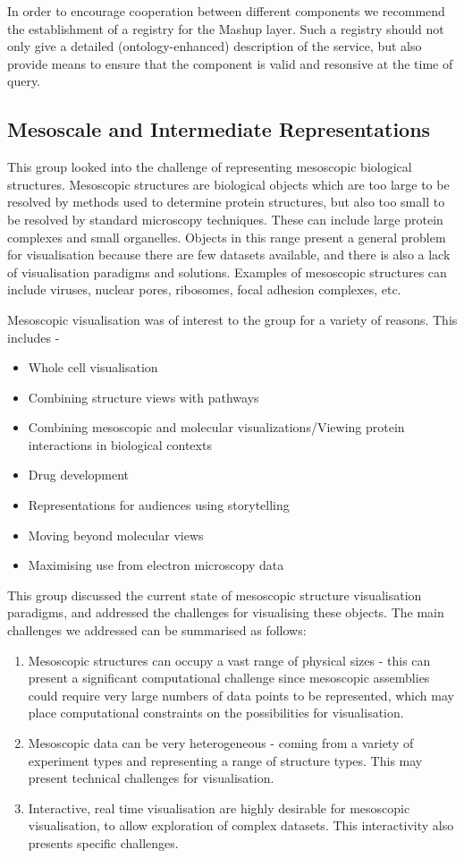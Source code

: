 \documentclass[a4paper]{article}
\begin{document}
In order to encourage cooperation between different components we recommend the establishment of a registry for the Mashup layer. Such a registry should not only give a detailed (ontology-enhanced) description of the service, but also provide means to ensure that the component is valid and resonsive at the time of query.


\subsection{Mesoscale and Intermediate Representations}

This group looked into the challenge of representing mesoscopic biological structures. Mesoscopic structures are biological objects which are too large to be resolved by methods used to determine protein structures, but also too small to be resolved by standard microscopy techniques. These can include large protein complexes and small organelles. Objects in this range present a general problem for visualisation because there are few datasets available, and there is also a lack of visualisation paradigms and solutions. Examples of mesoscopic structures can include viruses, nuclear pores, ribosomes, focal adhesion complexes, etc.

Mesoscopic visualisation was of interest to the group for a variety of reasons.
This includes -
\begin{itemize}
\item Whole cell visualisation
\item Combining structure views with pathways
\item Combining mesoscopic and molecular visualizations/Viewing protein interactions in biological contexts
\item Drug development
\item Representations for audiences using storytelling
\item Moving beyond molecular views
\item Maximising use from electron microscopy data
\end{itemize}

This group discussed the current state of mesoscopic structure visualisation paradigms, and addressed the challenges for visualising these objects. The main challenges we addressed can be summarised as follows:
\begin{enumerate}
\item Mesoscopic structures can occupy a vast range of physical sizes - this can present a significant computational challenge since mesoscopic assemblies could require very large numbers of data points to be represented, which may place computational constraints on the possibilities for visualisation.
\item Mesoscopic data can be very heterogeneous - coming from a variety of experiment types and representing a range of structure types. This may present technical challenges for visualisation.
\item Interactive, real time visualisation are highly desirable for mesoscopic visualisation, to allow exploration of complex datasets. This interactivity also presents specific challenges.
\end{enumerate}
\end{document}
